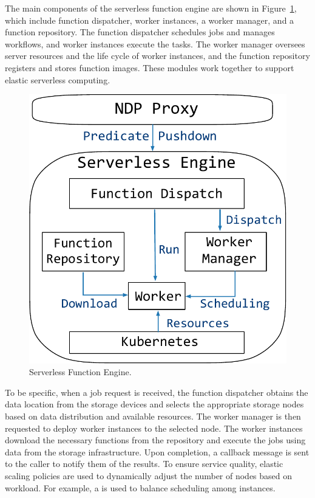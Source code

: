 The main components of the serverless function engine are shown in Figure~\ref{fig:serverless}, which include function dispatcher, worker instances, a worker manager, and a function repository. The function dispatcher schedules jobs and manages workflows, and worker instances execute the tasks. The worker manager oversees server resources and the life cycle of worker instances, and the function repository registers and stores function images. These modules work together to support elastic serverless computing.



\begin{figure}[htbp]
	\includegraphics[scale=0.35]{figures/serverless}
	\centering
	\vspace{-1em}
	\caption{Serverless Function Engine.}
	\label{fig:serverless}
	\vspace{-1em}
\end{figure}

To be specific, when a job request is received, the function dispatcher obtains the data location from the storage devices and selects the appropriate storage nodes based on data distribution and available resources. The worker manager is then requested to deploy worker instances to the selected node. The worker instances download the necessary functions from the repository and execute the jobs using data from the storage infrastructure. Upon completion, a callback message is sent to the caller to notify them of the results. To ensure service quality, elastic scaling policies are used to dynamically adjust the number of nodes based on workload. 
For example, a  is used to balance scheduling among instances.


